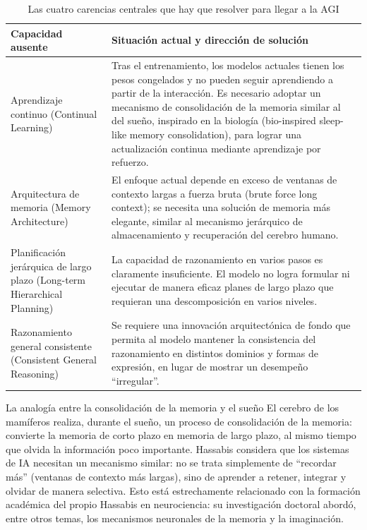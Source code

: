 \begin{table}[H]
\centering
\begin{tabular}{p{} p{}}
\toprule
\textbf{Capacidad ausente} & \textbf{Situación actual y dirección de solución} \\
\midrule
Aprendizaje continuo (Continual Learning) & Tras el entrenamiento, los modelos actuales tienen los pesos congelados y no pueden seguir aprendiendo a partir de la interacción. Es necesario adoptar un mecanismo de consolidación de la memoria similar al del sueño, inspirado en la biología (bio-inspired sleep-like memory consolidation), para lograr una actualización continua mediante aprendizaje por refuerzo. \\
Arquitectura de memoria (Memory Architecture) & El enfoque actual depende en exceso de ventanas de contexto largas a fuerza bruta (brute force long context); se necesita una solución de memoria más elegante, similar al mecanismo jerárquico de almacenamiento y recuperación del cerebro humano. \\
Planificación jerárquica de largo plazo (Long-term Hierarchical Planning) & La capacidad de razonamiento en varios pasos es claramente insuficiente. El modelo no logra formular ni ejecutar de manera eficaz planes de largo plazo que requieran una descomposición en varios niveles. \\
Razonamiento general consistente (Consistent General Reasoning) & Se requiere una innovación arquitectónica de fondo que permita al modelo mantener la consistencia del razonamiento en distintos dominios y formas de expresión, en lugar de mostrar un desempeño ``irregular''. \\
\bottomrule
\end{tabular}
\caption{Las cuatro carencias centrales que hay que resolver para llegar a la AGI}
\end{table}

\begin{knowledgebox}{La analogía entre la consolidación de la memoria y el sueño}
El cerebro de los mamíferos realiza, durante el sueño, un proceso de consolidación de la memoria: convierte la memoria de corto plazo en memoria de largo plazo, al mismo tiempo que olvida la información poco importante. Hassabis considera que los sistemas de IA necesitan un mecanismo similar: no se trata simplemente de ``recordar más'' (ventanas de contexto más largas), sino de aprender a retener, integrar y olvidar de manera selectiva. Esto está estrechamente relacionado con la formación académica del propio Hassabis en neurociencia: su investigación doctoral abordó, entre otros temas, los mecanismos neuronales de la memoria y la imaginación.
\end{knowledgebox}


